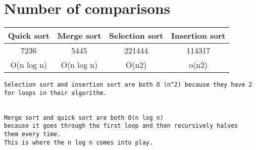 \documentclass{article}
\begin{document}
\section{Number of comparisons}
\begin{center}
\begin{tabular}{||c c c c||} 
 \hline
Quick sort & Merge sort & Selection sort & Insertion sort\\[0.5ex] 
 \hline\hline
 7236 & 5445 & 221444 & 114317 \\ 
 \hline
 O(n log n) & O(n log n) & O(n2) & o(n2) \\
 \hline
\end{tabular}
\end{center}
\begin{lstlisting}
Selection sort and insertion sort are both O (n^2) because they have 2 for loops in their algorithm.


Merge sort and quick sort are both O(n log n) 
because it goes through the first loop and then recursively halves them every time. 
This is where the n log n comes into play.
\end{lstlisting}
\end{document}
